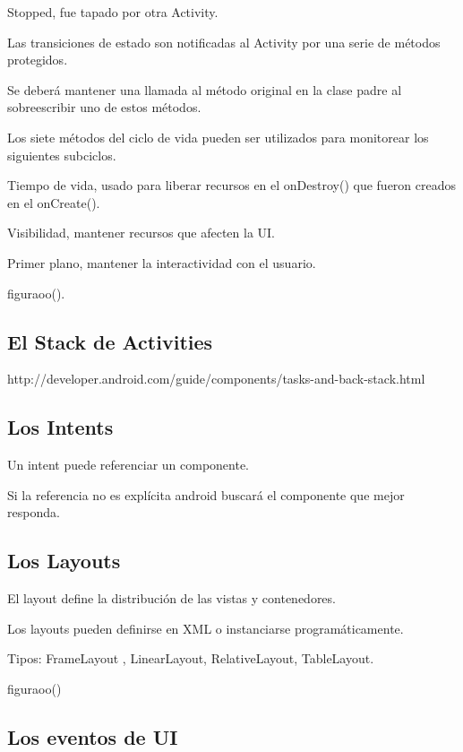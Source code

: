 Stopped, fue tapado por otra Activity.

Las transiciones de estado son notificadas al Activity por una serie de m\'etodos protegidos.

Se deber\'a mantener una llamada al m\'etodo original en la clase padre al sobreescribir uno de estos m\'etodos.

Los siete m\'etodos del ciclo de vida pueden ser utilizados para monitorear los siguientes subciclos.

Tiempo de vida, usado para liberar recursos en el onDestroy() que fueron creados en el onCreate().

Visibilidad, mantener recursos que afecten la UI.

Primer plano, mantener la interactividad con el usuario.

figuraoo().

\subsection{El Stack de Activities}
\label{subsec:dev.activity.stack}

http://developer.android.com/guide/components/tasks-and-back-stack.html


\subsection{Los Intents}
\label{subsec:dev.intents}

Un intent puede referenciar un componente.

Si la referencia no es explícita android buscará el componente  que mejor responda.

\subsection{Los Layouts}
\label{subsec:dev.layouts}

El layout define la distribuci\'on de las vistas y contenedores.

Los layouts pueden definirse en XML o instanciarse program\'aticamente.

Tipos: FrameLayout , LinearLayout, RelativeLayout, TableLayout.

figuraoo()

\subsection{Los eventos de \ac{UI}}
\label{subsec:dev.ui.events}

